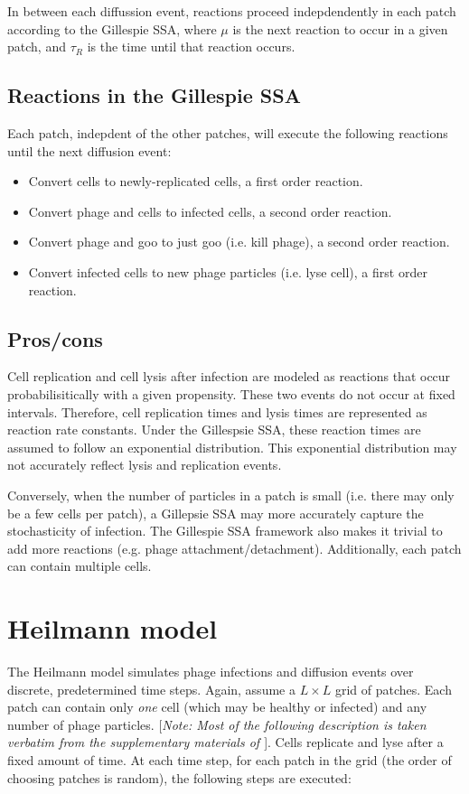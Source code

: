 \documentclass{article}
\begin{document}
In between each diffussion event, reactions proceed indepdendently in each patch according to the Gillespie SSA, where $\mu$ is the next reaction to occur in a given patch, and $\tau_R$ is the time until that reaction occurs.

\subsection{Reactions in the Gillespie SSA}
Each patch, indepdent of the other patches, will execute the following reactions until the next diffusion event:

\begin{itemize}
    \item Convert cells to newly-replicated cells, a first order reaction.
    \item Convert phage and cells to infected cells, a second order reaction.
    \item Convert phage and goo to just goo (i.e. kill phage), a second order reaction.
    \item Convert infected cells to new phage particles (i.e. lyse cell), a first order reaction.
\end{itemize}

\subsection{Pros/cons}
Cell replication and cell lysis after infection are modeled as reactions that occur probabilisitically with a given propensity. These two events do not occur at fixed intervals. Therefore, cell replication times and lysis times are represented as reaction rate constants. Under the Gillespsie SSA, these reaction times are assumed to follow an exponential distribution. This exponential distribution may not accurately reflect lysis and replication events.

Conversely, when the number of particles in a patch is small (i.e. there may only be a few cells per patch), a Gillepsie SSA may more accurately capture the stochasticity of infection. The Gillespie SSA framework also makes it trivial to add more reactions (e.g. phage attachment/detachment). Additionally, each patch can contain multiple cells.


\section{Heilmann model}

The Heilmann model \cite{heilmann} simulates phage infections and diffusion events over discrete, predetermined time steps. Again, assume a $L\times{L}$ grid of patches. Each patch can contain only \textit{one} cell (which may be healthy or infected) and any number of phage particles. [\textit{Note: Most of the following description is taken verbatim from the supplementary materials of \cite{heilmann}}]. Cells replicate and lyse after a fixed amount of time. At each time step, for each patch in the grid (the order of choosing patches is random), the following steps are executed:
\end{document}
